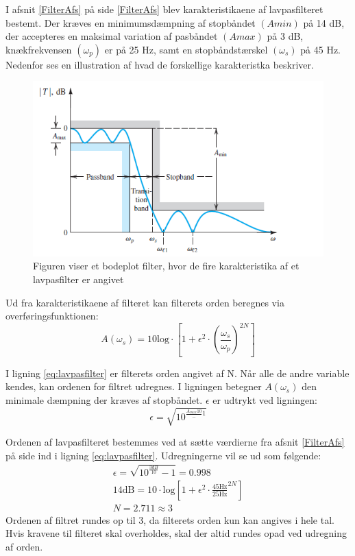 I afsnit \ref{FilterAfs} på side \ref{FilterAfs} blev karakteristikaene af lavpasfilteret bestemt. Der kræves en minimumsdæmpning af stopbåndet $(Amin)$ på 14 dB, der accepteres en maksimal variation af pasbåndet $(Amax)$ på 3 dB, knækfrekvensen $(\omega _p)$ er på 25 Hz, samt en stopbåndstærskel $(\omega _s)$ på 45 Hz. Nedenfor ses en illustration af hvad de forskellige karakteristka beskriver.

\begin{figure}[H]
	\centering
	\includegraphics[scale=0.8]{figures/cProblemloesning/Lavpasfilter_generisk.PNG}
	\caption{Figuren viser et bodeplot filter, hvor de fire karakteristika af et lavpasfilter er angivet}
	\label{fig:Lavpasfilter_generisk}
\end{figure}

\noindent Ud fra karakteristikaene af filteret kan filterets orden beregnes via overføringsfunktionen:
\begin{equation} \label{eq:lavpasfilter}
A(\omega_s) = 10 \text{log} \cdot \left[1 + \epsilon^2 \cdot (\frac{\omega _s}{\omega _p})^{2N}\right] 
\end{equation}

\noindent I ligning \ref{eq:lavpasfilter} er filterets orden angivet af N. Når alle de andre variable kendes, kan ordenen for filtret udregnes. I ligningen betegner $A(\omega _s)$ den minimale dæmpning der kræves af stopbåndet. $\epsilon$ er udtrykt ved ligningen:
\begin{equation}
\epsilon = \sqrt{10^{\frac{A_{max}{10}} - 1}}
\end{equation}

Ordenen af lavpasfilteret bestemmes ved at sætte værdierne fra afsnit \ref{FilterAfs} på side \pageref{FilterAfs} ind i ligning \ref{eq:lavpasfilter}. Udregningerne vil se ud som følgende:
\begin{align}
\epsilon = \sqrt{10^{\frac{3dB}{10}} - 1} = 0.998 \\
14\text{dB} = 10 \cdot \text{log} \left[1 + \epsilon ^2 \cdot \frac{45\text{Hz}}{25\text{Hz}}^{2N}\right] \\
N = 2.711 \approx 3
\end{align}
\noindent Ordenen af filtret rundes op til 3, da filterets orden kun kan angives i hele tal. Hvis kravene til filteret skal overholdes, skal der altid rundes opad ved udregning af orden.

